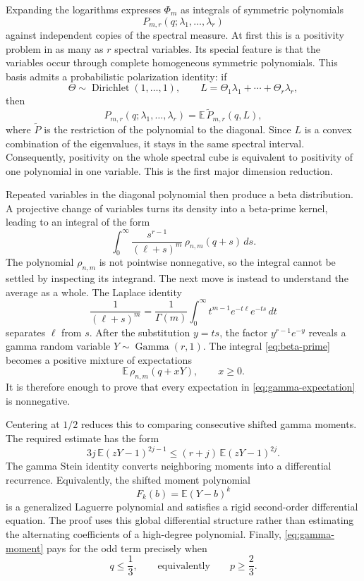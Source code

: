 \documentclass[10pt]{article}
\newcommand{\E}{\mathbb E}
\begin{document}
Expanding the logarithms expresses $\Phi_m$ as integrals of symmetric polynomials
\[
  P_{m,r}(q;\lambda_1,\ldots,\lambda_r)
\]
against independent copies of the spectral measure.  At first this is a positivity problem in as many as $r$ spectral variables.  Its special feature is that the variables occur through complete homogeneous symmetric polynomials.  This basis admits a probabilistic polarization identity: if
\[
  \Theta\sim\operatorname{Dirichlet}(1,\ldots,1),
  \qquad
  L=\Theta_1\lambda_1+\cdots+\Theta_r\lambda_r,
\]
then
\begin{equation}\label{eq:dirichlet}
  P_{m,r}(q;\lambda_1,\ldots,\lambda_r)
  =\E\,\widetilde P_{m,r}(q,L),
\end{equation}
where $\widetilde P$ is the restriction of the polynomial to the diagonal.  Since $L$ is a convex combination of the eigenvalues, it stays in the same spectral interval.  Consequently, positivity on the whole spectral cube is equivalent to positivity of one polynomial in one variable.  This is the first major dimension reduction.

Repeated variables in the diagonal polynomial then produce a beta distribution.  A projective change of variables turns its density into a beta-prime kernel, leading to an integral of the form
\begin{equation}\label{eq:beta-prime}
  \int_0^\infty
  \frac{s^{r-1}}{(\ell+s)^m}\,
  \rho_{n,m}(q+s)\,ds.
\end{equation}
The polynomial $\rho_{n,m}$ is not pointwise nonnegative, so the integral cannot be settled by inspecting its integrand.  The next move is instead to understand the average as a whole.  The Laplace identity
\[
  \frac1{(\ell+s)^m}
  =\frac1{\Gamma(m)}\int_0^\infty t^{m-1}e^{-t\ell}e^{-ts}\,dt
\]
separates $\ell$ from $s$.  After the substitution $y=ts$, the factor $y^{r-1}e^{-y}$ reveals a gamma random variable $Y\sim\operatorname{Gamma}(r,1)$.  The integral \eqref{eq:beta-prime} becomes a positive mixture of expectations
\begin{equation}\label{eq:gamma-expectation}
  \E\,\rho_{n,m}(q+xY),
  \qquad x\ge0.
\end{equation}
It is therefore enough to prove that every expectation in \eqref{eq:gamma-expectation} is nonnegative.

Centering at $1/2$ reduces this to comparing consecutive shifted gamma moments.  The required estimate has the form
\begin{equation}\label{eq:gamma-moment}
  3j\,\E(zY-1)^{2j-1}
  \le (r+j)\,\E(zY-1)^{2j}.
\end{equation}
The gamma Stein identity converts neighboring moments into a differential recurrence.  Equivalently, the shifted moment polynomial
\[
  F_k(b)=\E(Y-b)^k
\]
is a generalized Laguerre polynomial and satisfies a rigid second-order differential equation.  The proof uses this global differential structure rather than estimating the alternating coefficients of a high-degree polynomial.  Finally, \eqref{eq:gamma-moment} pays for the odd term precisely when
\[
  q\le\frac13,
  \qquad\text{equivalently}\qquad p\ge\frac23.
\]
\end{document}
